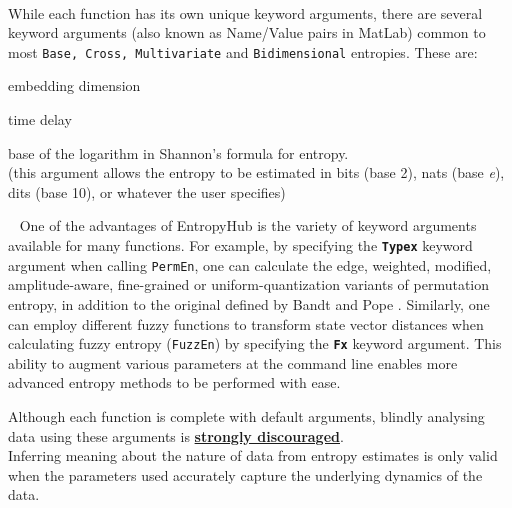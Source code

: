 \documentclass[12pt, a4paper, titlepage, openany]{book}
\begin{document}
\ \noindent \newline
\indent{}\\

While each function has its own unique keyword arguments, there are several keyword arguments (also known as Name/Value pairs in MatLab) common to most \texttt{Base, Cross, Multivariate} and \texttt{Bidimensional} entropies. These are: \small
\begin{description}[labelsep=5mm, labelwidth=3cm, nosep,style=multiline,leftmargin=45mm]
\item[\texttt{\textbf{m}}]  	embedding dimension
\item[\texttt{\textbf{tau}}] time delay
\item[\texttt{\textbf{Logx}}]  	base of the logarithm in Shannon’s formula for entropy. \\
					(this argument allows the entropy to be estimated in bits (base 2), nats (base \emph{e}), dits (base 10), or whatever the user specifies)
\end{description}

\ \newline
One of the advantages of EntropyHub is the variety of keyword arguments available for many functions. For example, by specifying the \texttt{\textbf{Typex}} keyword argument when calling \texttt{PermEn}, one can calculate the edge, weighted, modified, amplitude-aware, fine-grained or uniform-quantization variants of permutation entropy, in addition to the original defined by Bandt and Pope \cite{Perm1}. Similarly, one can employ different fuzzy functions to transform state vector distances when calculating fuzzy entropy (\texttt{FuzzEn}) by specifying the \texttt{\textbf{Fx}} keyword argument. This ability to augment various parameters at the command line enables more advanced entropy methods to be performed with ease. \\

\begin{tcolorbox}[sharp corners, colback=ehone!30, colframe=ehone, title=\textbf{IMPORTANT NOTE}]
Although each function is complete with default arguments, blindly analysing data using these arguments is \textbf{\ul{strongly discouraged}}.\\ Inferring meaning about the nature of data from entropy estimates is only valid when the parameters used accurately capture the underlying dynamics of the data.
\end{tcolorbox}
\end{document}
